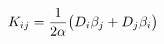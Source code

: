 \documentclass[preview]{standalone}
\begin{document}
\begin{align*}
\special{dvisvgm:raw <g id='unique000'>}K_{ij} = \frac{1}{2\alpha}\big(D_i\beta_j + D_j\beta_i\big)\special{dvisvgm:raw </g>}
\end{align*}
\end{document}
